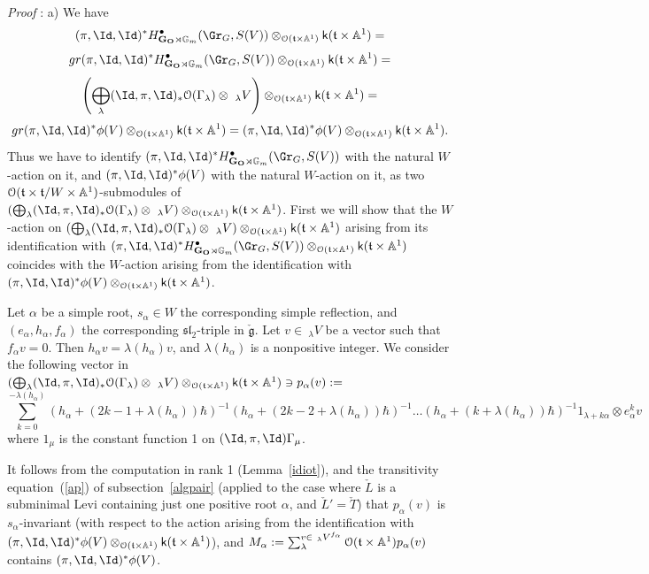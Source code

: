 \documentclass[11pt]{amsart}
\theoremstyle{definition}
\theoremstyle{remark}
\renewcommand{\O}{{\mathcal O}}
\theoremstyle{remark}
\newcommand{\cal}{\mathcal}
\newcommand{\<}{\langle}
\renewcommand{\>}{\rangle}
\renewcommand{\t}{{\frak t}}
\newcommand{\Lg}{\check{\mathfrak g}{}}
\newcommand{\LL}{\check{L}{}}
\newcommand{\LT}{\check{T}{}}
\renewcommand{\O}{{\cal O}}
\newcommand{\GO}{{\bf G_O}}
\newcommand{\Aone}{{\mathbb A}^1}
\newcommand{\Gm}{{{\mathbb G}_m}}
\newcommand{\kk}{\mathsf k}
\renewcommand{\proof}{{\it Proof }}
\begin{document}
\proof: a) We have $$(\pi,\Id,\Id)^*H^\bullet_{\GO\rtimes\Gm}(\Gr_G,S(V))
\otimes_{\O(\t\times\Aone)}\kk(\t\times\Aone)=$$
$$gr(\pi,\Id,\Id)^*H^\bullet_{\GO\rtimes\Gm}(\Gr_G,S(V))
\otimes_{\O(\t\times\Aone)}\kk(\t\times\Aone)=$$
$$\left(\bigoplus_\lambda(\Id,\pi,\Id)_*\O(\Gamma_\lambda)\otimes\ _\lambda V
\right)\otimes_{\O(\t\times\Aone)}\kk(\t\times\Aone)=$$
$$gr(\pi,\Id,\Id)^*\phi(V)\otimes_{\O(\t\times\Aone)}\kk(\t\times\Aone)=
(\pi,\Id,\Id)^*\phi(V)\otimes_{\O(\t\times\Aone)}\kk(\t\times\Aone).$$
Thus we have to identify $(\pi,\Id,\Id)^*H^\bullet_{\GO\rtimes\Gm}(\Gr_G,S(V))$
with the natural $W$-action on it, and $(\pi,\Id,\Id)^*\phi(V)$ with the
natural $W$-action on it, as two $\O(\t\times\t/W\times\Aone)$-submodules
of $\left(\bigoplus_\lambda(\Id,\pi,\Id)_*\O(\Gamma_\lambda)\otimes\ _\lambda V
\right)\otimes_{\O(\t\times\Aone)}\kk(\t\times\Aone)$. First we will
show that the $W$-action on
$\left(\bigoplus_\lambda(\Id,\pi,\Id)_*\O(\Gamma_\lambda)\otimes\ _\lambda V
\right)\otimes_{\O(\t\times\Aone)}\kk(\t\times\Aone)$ 
arising from its identification with
$(\pi,\Id,\Id)^*H^\bullet_{\GO\rtimes\Gm}(\Gr_G,S(V))
\otimes_{\O(\t\times\Aone)}\kk(\t\times\Aone)$ coincides with the $W$-action
arising from the identification with 
$(\pi,\Id,\Id)^*\phi(V)\otimes_{\O(\t\times\Aone)}\kk(\t\times\Aone)$.
 
Let $\alpha$ be a simple root, $s_\alpha\in W$ the corresponding
simple reflection, and $(e_\alpha,h_\alpha,f_\alpha)$ the corresponding
$\mathfrak{sl}_2$-triple in $\Lg$. Let $v\in\ _\lambda V$ be a vector such that
$f_\alpha v=0$. Then $h_\alpha v=\lambda(h_\alpha)v$, and $\lambda(h_\alpha)$
is a nonpositive integer. We consider the following vector in
$\left(\bigoplus_\lambda(\Id,\pi,\Id)_*\O(\Gamma_\lambda)\otimes\ _\lambda V
\right)\otimes_{\O(\t\times\Aone)}\kk(\t\times\Aone)\ni
p_\alpha(v):=$
$$\sum_{k=0}^{-\lambda(h_\alpha)}
(h_\alpha+(2k-1+\lambda(h_\alpha))\hbar)^{-1}
(h_\alpha+(2k-2+\lambda(h_\alpha))\hbar)^{-1}\ldots
(h_\alpha+(k+\lambda(h_\alpha))\hbar)^{-1}
1_{\lambda+k\alpha}\otimes e_\alpha^kv$$
where $1_\mu$ is the constant function 1 on $(\Id,\pi,\Id)\Gamma_\mu$.

It follows from the computation in rank 1 (Lemma~\ref{idiot}),
and the transitivity equation~(\ref{ap}) of subsection~\ref{algpair}
(applied to the case where $\LL$ is a subminimal Levi containing just one
positive root $\alpha$, and $\LL'=\LT$) 
that $p_\alpha(v)$ is $s_\alpha$-invariant
(with respect to the action arising from the identification with
$(\pi,\Id,\Id)^*\phi(V)\otimes_{\O(\t\times\Aone)}\kk(\t\times\Aone)$),
and $M_\alpha:=
\sum_\lambda^{v\in\ _\lambda V^{f_\alpha}}\O(\t\times\Aone)p_\alpha(v)$
contains $(\pi,\Id,\Id)^*\phi(V)$. 
\end{document}
